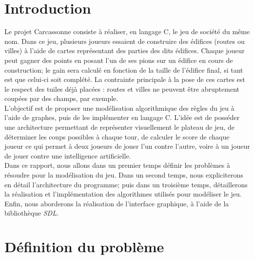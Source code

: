 \documentclass[a4paper, 11pt]{article}
\begin{document}
\newpage

\section*{Introduction}
   Le projet Carcassonne consiste à réaliser, en langage C, le jeu de société du même nom. Dans ce jeu, plusieurs joueurs essaient de construire des édifices (routes ou villes) à l'aide de cartes représentant des parties des dits édifices. Chaque joueur peut gagner des points en posant l'un de ses pions sur un édifice en cours de construction; le gain sera calculé en fonction de la taille de l'édifice final, si tant est que celui-ci soit complété. La contrainte principale à la pose de ces cartes est le respect des tuiles déjà placées : routes et villes ne peuvent être abruptement coupées par des champs, par exemple.\\
\indent L'objectif est de proposer une modélisation algorithmique des règles du jeu à l'aide de graphes, puis de les implémenter en langage C. L'idée est de posséder une architecture permettant de représenter visuellement le plateau de jeu, de déterminer les coups possibles à chaque tour, de calculer le score de chaque joueur ce qui permet à deux joueurs de jouer l'un contre l'autre, voire à un joueur de jouer contre une intelligence artificielle.\\
\indent Dans ce rapport, nous allons dans un premier temps définir les problèmes à résoudre pour la modélisation du jeu. Dans un second temps, nous expliciterons en détail l'architecture du programme; puis dans un troisième temps, détaillerons la réalisation et l'implémentation des algorithmes utilisés pour modéliser le jeu. Enfin, nous aborderons la réalisation de l'interface graphique, à l'aide de la bibliothèque \emph{SDL}.
    
\newpage
 
 
 \section{Définition du problème}
\end{document}
